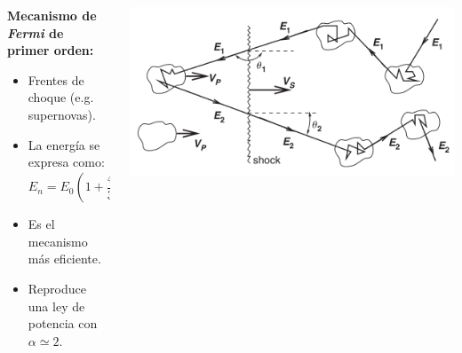     \begin{frame}{} %
        \justifying %

        \begin{columns}
            \begin{column}{0.45\textwidth} %
            		\textbf{\small Mecanismo de \emph{Fermi} de primer orden:}
                \begin{itemize}
                    \item Frentes de choque (e.g. supernovas).
                    \item La energía se expresa como: \[E_{n} = E_{0} \left(1 + \frac{4}{3} \beta\right)^{n}\]
                    \item Es el mecanismo más eficiente.
                    \item Reproduce una ley de potencia con $\alpha \simeq 2$.
                \end{itemize}
            \end{column}

            \begin{column}{0.4\textwidth} %
                \includegraphics[width=1.16\textwidth]{Figures/fermifirstorder.png}
            \end{column}
        \end{columns}
    \end{frame}